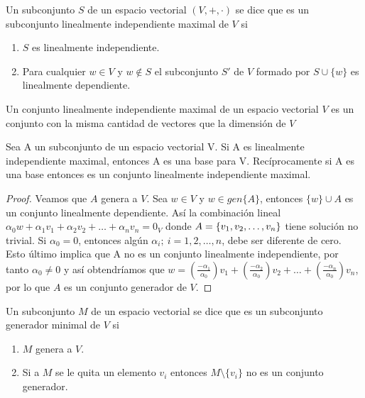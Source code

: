 \begin{dfn}
Un subconjunto $S$ de un espacio vectorial $(V, +, \cdot)$ se dice que es un subconjunto linealmente independiente maximal de $V$ si\\
\begin{enumerate}
\item $S$ es linealmente independiente.
\item Para cualquier $w \in V$ y $w \notin S$ el subconjunto $S'$ de $V$ formado por $S \cup \{w\}$ es linealmente dependiente.
\end{enumerate}
\end{dfn}
\begin{obsimp}
Un conjunto linealmente independiente maximal de un espacio vectorial $V$ es un conjunto con la misma cantidad de vectores que la dimensión de $V$
\end{obsimp}
\begin{theorem}
Sea A un subconjunto de un espacio vectorial V. Si A es linealmente independiente maximal, entonces A es una base para V. Recíprocamente si A es una base entonces es un conjunto linealmente independiente maximal.
\end{theorem}
\begin{proof}
Veamos que $A$ genera a $V$. Sea $w \in V$ y $w \in gen\{A\}$, entonces $\{w\}\cup A$ es un conjunto linealmente dependiente. Así la combinación lineal $\alpha_0 w+\alpha_1v_1+\alpha_2v_2+\hdots+\alpha_nv_n=0_V$ donde $A= \lbrace v_1, v_2, \ldots, v_n \rbrace$ tiene solución no trivial. Si $\alpha_0=0$, entonces algún $\alpha_i;\ i=1, 2, \hdots, n$, debe ser diferente de cero. Esto último implica que A no es un conjunto linealmente independiente, por tanto $\alpha_0\neq 0$ y así obtendríamos que $w=\left(\frac{-\alpha_1}{\alpha_0}\right)v_1+\left(\frac{-\alpha_2}{\alpha_0}\right)v_2+\hdots+\left(\frac{-\alpha_n}{\alpha_0}\right)v_n$, por lo que $A$ es un conjunto generador de $V$.
\end{proof}
\begin{dfn}
Un subconjunto $M$ de un espacio vectorial se dice que es un subconjunto generador minimal de $V$ si
\begin{enumerate}
\item $M$ genera a $V$.
\item Si a $M$ se le quita un elemento $v_i$ entonces $M \setminus \{v_i\}$ no es un conjunto generador.
\end{enumerate}
\end{dfn}

